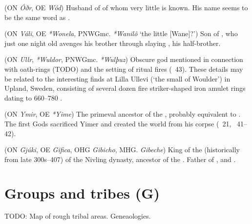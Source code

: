 \begin{itemize}
 (ON \emph{Óðr}, OE \emph{Wód})
  Husband of  of whom very little is known.  His name seems to be the same word as .

 (ON \emph{Váli}, OE \emph{*Wonela}, PNWGmc. \emph{*Wanilô} ‘the little [Wane]?’)
  Son of , who just one night old avenges his brother  through slaying , his half-brother.

 (ON \emph{Ullr}, \emph{*Wuldor}, PNWGmc. \emph{*Wulþuz})
  Obscure god mentioned in connection with oath-rings (TODO) and the setting of ritual fires (\Grimnismal\ 43). These details may be related to the interesting finds at Lilla Ullevi (‘the small  of Woulder’) in Upland, Sweden, consisting of several dozen fire striker-shaped iron amulet rings dating to 660–780 \textcite{afEdholm2009}.

 (ON \emph{Ymir}, OE \emph{*Yime})
  The primeval ancestor of the , probably equivalent to .  The first Gods sacrificed Yimer and created the world from his corpse (\Vafthrudnismal\ 21, \Grimnismal\ 41–42).

 (ON \emph{Gjúki}, OE \emph{Gifica}, OHG \emph{Gibicho}, MHG. \emph{Gibeche})
  King of the  (historically from late 300s–407) of the Nivling dynasty, ancestor of the . Father of ,  and .
\end{itemize}

\section{Groups and tribes (G)}
TODO: Map of rough tribal areas. Geneaologies.

